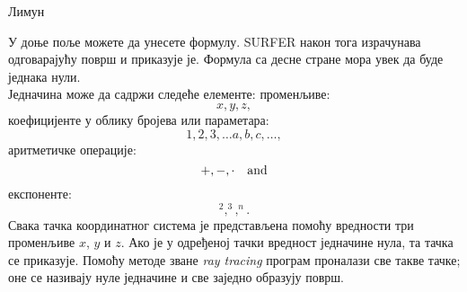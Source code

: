 \documentclass[sr]{./../../common/SurferDesc}%
\begin{document}
\footnotesize
%
\begin{surferPage}
  \begin{surferTitle}Лимун
  \end{surferTitle}   %

У доње поље можете да унесете формулу. SURFER  након тога израчунава одговарајућу површ и приказује је. Формула са десне стране мора увек да буде једнака нули.
\\
Једначина може да садржи следеће елементе:
\newline
променљиве:
\[x, y, z, \]
коефицијенте у облику бројева или параметара:
\[1, 2, 3, \dots a, b, c, \dots, \]
аритметичке операције:
\[+,  - , \cdot \quad \textnormal{and} \]
експоненте:
\[ ^2, ^3, ^n .\]
Свака тачка координатног система је представљена помоћу вредности три променљиве $x$, $y$ и $z$. Ако је у одређеној тачки вредност једначине нула, та тачка се приказује. Помоћу методе зване \textit{ray tracing} програм проналази све такве тачке; оне се називају нуле једначине и све заједно образују површ.

  
  \begin{surferText}
     \end{surferText}
\end{surferPage}


\end{document}
